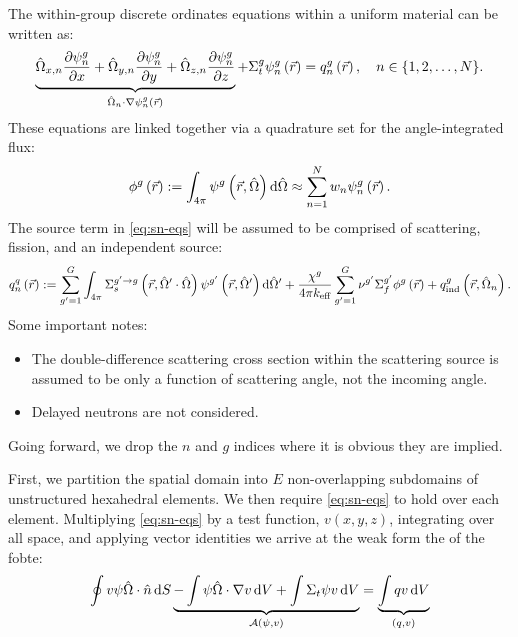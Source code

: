 The within-group discrete ordinates equations within a uniform material can be written as:
\begin{equation}
  \label{eq:sn-eqs}
  \underbrace{\hat{\Omega}_{x,n}\pdv{\psi_n^g}{x}+\hat{\Omega}_{y,n}\pdv{\psi_n^g}{y}+\hat{\Omega}_{z,n}\pdv{\psi_n^g}{z}}_{\hat{\Omega}_n\cdot\nabla\psi_n^g \left(\vec{r}\right)}+\Sigma_t^g \psi_n^g\left(\vec{r}\right)=q_n^g\left(\vec{r}\right),\quad n\in \{1,2,\ldots,N\}.
\end{equation}
These equations are linked together via a quadrature set for the angle-integrated flux:
\begin{equation}
  \phi^g\rarg := \int_{4\pi}\psi^g\ro\odif{\ohat}\approx \sum_{n=1}^{N}w_n\psing \rarg.
\end{equation}
The source term in \cref{eq:sn-eqs} will be assumed to be comprised of scattering, fission, and an independent source:
\begin{equation}
  q_n^q\rarg:= \sum_{g'=1}^G \int_{4\pi}\Sigma_s^{g'\rightarrow g}\left(\rvec,\ohat'\cdot\ohat\right)\psi^{g'}\left(\rvec,\ohat'\right)\odif{\ohat'}+\frac{\chi^g}{4\pi \keff } \sum_{g'=1}^G  \nu^{g'}\Sigma_f^{g'}\phi^g\rarg+q^g_{\text{ind}}\left(\rvec,\ohat_n\right).
\end{equation}
Some important notes:
\begin{itemize}
  \item The double-difference scattering cross section within the scattering source is assumed to be only a function of scattering angle, not the incoming angle.
  \item Delayed neutrons are not considered.
\end{itemize}
Going forward, we drop the $n$ and $g$ indices where it is obvious they are implied.

First, we partition the spatial domain into $E$ non-overlapping subdomains of unstructured hexahedral elements.
We then require \cref{eq:sn-eqs} to hold over each element.
Multiplying \cref{eq:sn-eqs} by a test function, $v(x,y,z)$, integrating over all space, and applying vector identities we arrive at the weak form the of the \gls{fobte}:
\begin{equation}
  \label{eq:weak-form}
  \oint v\psi\ohat\cdot\hat{n}\odif{S}\underbrace{-\int \psi\ohat\cdot\nabla v\odif{V}+\int\Sigma_t\psi v\odif{V}}_{\mathcal{A}(\psi,v)}=\underbrace{\int qv\odif{V}}_{(q,v)}
\end{equation}

